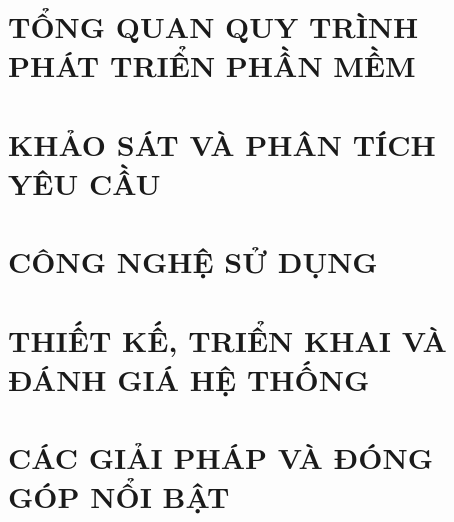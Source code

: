 \documentclass[a4paper,13pt,3p,twoside]{report}
\theoremstyle{definition}
\begin{document}
\glsaddall
 \renewcommand*{\glossaryname}{Danh sách thuật ngữ}
\renewcommand*{\acronymname}{DANH MỤC THUẬT NGỮ VÀ TỪ VIẾT TẮT}
\renewcommand*{\entryname}{Thuật ngữ}
\renewcommand*{\descriptionname}{Ý nghĩa}

%  

% 


\newpage
{}

\pagestyle{fancy}
\fancyhf{}
\fancyhead[RE, LO]{\leftmark}
\fancyfoot[RE, LO]{\thepage}

\chapter{TỔNG QUAN QUY TRÌNH PHÁT TRIỂN PHẦN MỀM}
\label{chapter:Introduction}

\newpage
\chapter{KHẢO SÁT VÀ PHÂN TÍCH YÊU CẦU}
\label{chapter:Related_works}



\newpage
\chapter{CÔNG NGHỆ SỬ DỤNG}
\label{chapter:Methodology}


\newpage
\chapter{THIẾT KẾ, TRIỂN KHAI VÀ ĐÁNH GIÁ HỆ THỐNG}
\label{chapter:Experiment}


\newpage
\chapter{CÁC GIẢI PHÁP VÀ ĐÓNG GÓP NỔI BẬT}
\label{chapter:SolutionAndContribution}

\newpage
\end{document}
